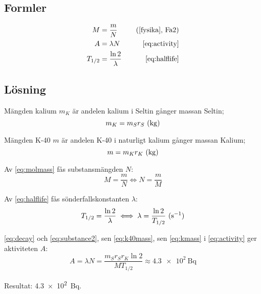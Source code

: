 \subsection*{Formler}

\begin{align}
    M       &= \frac{m}{N}           &\quad \fysika{Fa2} \label{eq:molmass} \\
    A       &= \lambda N             &\quad \eqref{eq:activity} \nonumber   \\
    T_{1/2} &= \frac{\ln 2}{\lambda} &\quad \eqref{eq:halflife} \nonumber
\end{align}

\subsection*{Lösning}

Mängden kalium $m_K$ är andelen kalium i Seltin gånger massan Seltin;
%
\begin{equation}
    m_K = m_S r_S \inlineunit{\kg} \label{eq:kmass}
\end{equation}

Mängden K-40 $m$ är andelen K-40 i naturligt kalium gånger massan Kalium;
%
\begin{equation}
    m = m_K r_K \inlineunit{\kg} \label{eq:k40mass}
\end{equation}

Av \eqref{eq:molmass} fås substansmängden $N$:
%
\begin{equation}
    M = \frac{m}{N} \iff N = \frac{m}{M} \label{eq:substance2}
\end{equation}

Av \eqref{eq:halflife} fås sönderfallskonstanten $\lambda$:
%
\begin{equation}
    T_{1/2} = \frac{\ln 2}{\lambda} \iff \lambda = \frac{\ln 2}{T_{1/2}} \inlineunit{\per\s} \label{eq:decay}
\end{equation}

\eqref{eq:decay} och \eqref{eq:substance2}, sen \eqref{eq:k40mass}, sen
\eqref{eq:kmass} i \eqref{eq:activity} ger aktiviteten $A$:
%
\begin{equation}
    A = \lambda N = \frac{m_S r_S r_K \ln 2}{M T_{1/2}} \approx \qty{4.3e2}{\becquerel}
\end{equation}

Resultat: \qty{4.3e2}{\becquerel}.
